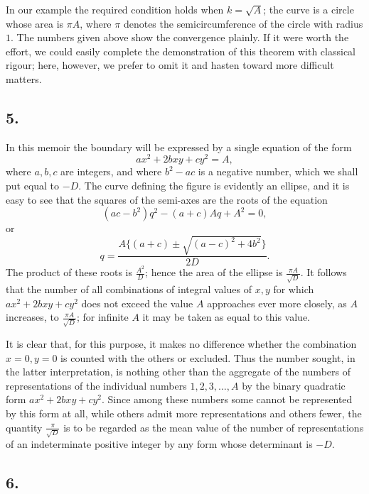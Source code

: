 \documentclass[12pt]{article}
\begin{document}
In our example the required condition holds when $k=\sqrt A$; the curve is a circle whose area is $\pi A$, where $\pi$ denotes the semicircumference of the circle with radius $1$. The numbers given above show the convergence plainly. If it were worth the effort, we could easily complete the demonstration of this theorem with classical rigour; here, however, we prefer to omit it and hasten toward more difficult matters.

\subsection*{5.}

In this memoir the boundary will be expressed by a single equation of the form
\[
ax^2+2bxy+cy^2=A,
\]
where $a,b,c$ are integers, and where $b^2-ac$ is a negative number, which we shall put equal to $-D$. The curve defining the figure is evidently an ellipse, and it is easy to see that the squares of the semi-axes are the roots of the equation
\[
(ac-b^2)q^2-(a+c)Aq+A^2=0,
\]
or
\[
q=\frac{A\{(a+c)\pm \sqrt{(a-c)^2+4b^2}\}}{2D}.
\]
The product of these roots is $\frac{A^2}{D}$; hence the area of the ellipse is $\frac{\pi A}{\sqrt D}$. It follows that the number of all combinations of integral values of $x,y$ for which $ax^2+2bxy+cy^2$ does not exceed the value $A$ approaches ever more closely, as $A$ increases, to $\frac{\pi A}{\sqrt D}$; for infinite $A$ it may be taken as equal to this value.

It is clear that, for this purpose, it makes no difference whether the combination $x=0,y=0$ is counted with the others or excluded. Thus the number sought, in the latter interpretation, is nothing other than the aggregate of the numbers of representations of the individual numbers $1,2,3,\ldots,A$ by the binary quadratic form $ax^2+2bxy+cy^2$. Since among these numbers some cannot be represented by this form at all, while others admit more representations and others fewer, the quantity $\frac{\pi}{\sqrt D}$ is to be regarded as the mean value of the number of representations of an indeterminate positive integer by any form whose determinant is $-D$.

\subsection*{6.}
\end{document}
